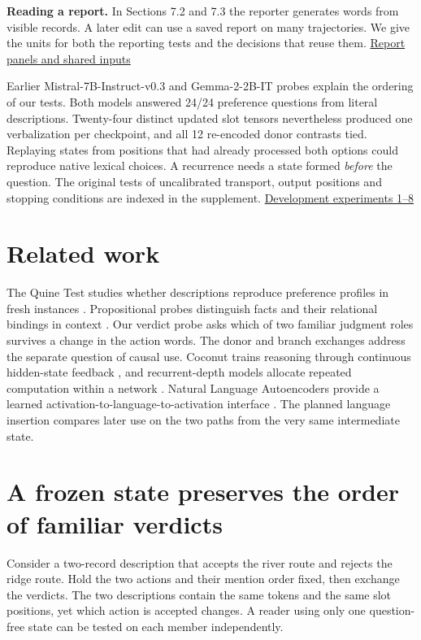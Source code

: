 \documentclass[11pt]{article}
\begin{document}
\textbf{Reading a report.} In Sections 7.2 and 7.3 the reporter generates words from visible records. A later edit can use a saved report on many trajectories. We give the units for both the reporting tests and the decisions that reuse them. \href{https://github.com/RyoSpiralArchitect/self-fold/blob/2f32a5f41b82a4e1cf1e86006c04f1a04c7e2ede/paper/REPORT_PANEL_COUNTS.md}{Report panels and shared inputs}

Earlier Mistral-7B-Instruct-v0.3 and Gemma-2-2B-IT probes explain the ordering of our tests. Both models answered 24/24 preference questions from literal descriptions. Twenty-four distinct updated slot tensors nevertheless produced one verbalization per checkpoint, and all 12 re-encoded donor contrasts tied. Replaying states from positions that had already processed both options could reproduce native lexical choices. A recurrence needs a state formed \emph{before} the question. The original tests of uncalibrated transport, output positions and stopping conditions are indexed in the supplement. \href{https://github.com/RyoSpiralArchitect/self-fold/blob/v1.0.0/paper/DEVELOPMENT_RECORD.md#study-1}{Development experiments 1--8}

\section*{Related work}

The Quine Test studies whether descriptions reproduce preference profiles in fresh instances \citep{babu2026quine}. Propositional probes distinguish facts and their relational bindings in context \citep{feng2024propositional}. Our verdict probe asks which of two familiar judgment roles survives a change in the action words. The donor and branch exchanges address the separate question of causal use. Coconut trains reasoning through continuous hidden-state feedback \citep{hao2024coconut}, and recurrent-depth models allocate repeated computation within a network \citep{geiping2025huginn}. Natural Language Autoencoders provide a learned activation-to-language-to-activation interface \citep{frasertaliente2026nla}. The planned language insertion compares later use on the two paths from the very same intermediate state.

\section{A frozen state preserves the order of familiar verdicts}

Consider a two-record description that accepts the river route and rejects the ridge route. Hold the two actions and their mention order fixed, then exchange the verdicts. The two descriptions contain the same tokens and the same slot positions, yet which action is accepted changes. A reader using only one question-free state can be tested on each member independently.
\end{document}
